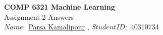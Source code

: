 \documentclass[10pt,letter,notitlepage]{article}
\newcommand{\red}[1]{{\color{red}#1}}
\newcounter{exercise}
\begin{document}
\begin{center}
  \large{\textbf{COMP 6321 Machine Learning} \\ Assignment 2 Answers} \\


$Name:$ \href{https://benymaxparsa.github.io}{Parsa Kamalipour} \; , \; $Student ID:$ 40310734

\end{center}
%    
%
%
\end{document}
